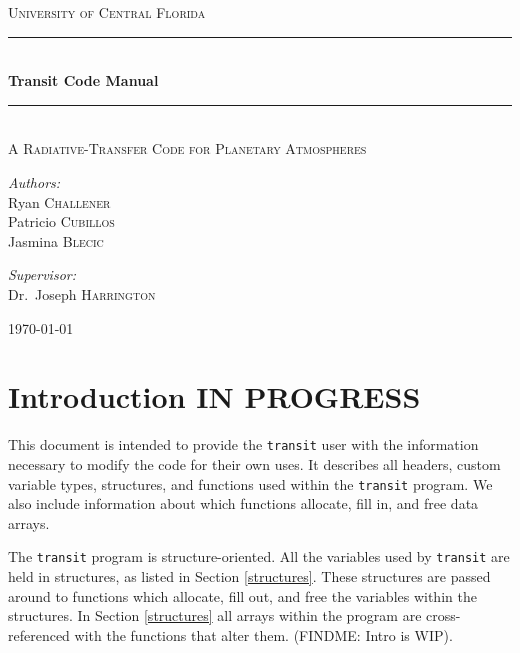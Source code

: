 \documentclass[letterpaper,12pt]{article}
\begin{document}
\begin{titlepage}
\begin{center}

\textsc{\LARGE University of Central Florida}\\[1.5cm]

\rule{\linewidth}{0.5mm} \\[0.4cm]
{ \huge \bfseries Transit Code Manual \\[0.4cm] }
\rule{\linewidth}{0.5mm} \\[1.0cm]

\textsc{\Large A Radiative-Transfer Code for Planetary Atmospheres}\\[1.5cm]

\noindent
\begin{minipage}{0.4\textwidth}
\begin{flushleft} \large
\emph{Authors:}\\
Ryan     \textsc{Challener} \\
Patricio \textsc{Cubillos}\\
Jasmina  \textsc{Blecic}  \\
\end{flushleft}
\end{minipage}%
\begin{minipage}{0.4\textwidth}
\begin{flushright} \large
\emph{Supervisor:} \\
Dr.~Joseph \textsc{Harrington}
\end{flushright}
\end{minipage}

\vfill

{\large \today}

\end{center}
\end{titlepage}


\section{Introduction IN PROGRESS}
This document is intended to provide the \texttt{transit} user with the information necessary to modify the code for their own uses. It describes all headers, custom variable types, structures, and functions used within the \texttt{transit} program. We also include information about which functions allocate, fill in, and free data arrays. 

The \texttt{transit} program is structure-oriented. All the variables used by \texttt{transit} are held in structures, as listed in Section \ref{structures}. These structures are passed around to functions which allocate, fill out, and free the variables within the structures. In Section \ref{structures} all arrays within the program are cross-referenced with the functions that alter them.
(FINDME: Intro is WIP).
\end{document}

